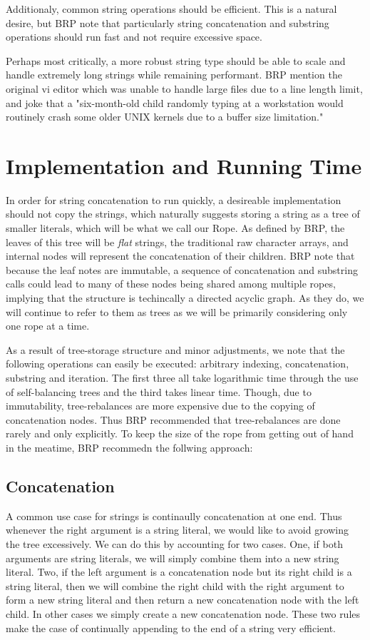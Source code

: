 \documentclass[12pt]{article}
\begin{document}
Additionaly, common string operations should be efficient. This is a natural desire, but BRP  note that particularly string concatenation and substring operations should run fast and not require excessive space.

Perhaps most critically, a more robust string type should be able to scale and handle extremely long strings while remaining performant. BRP mention the original vi editor which was unable to handle large files due to a line length limit, and joke that a "six-month-old child randomly typing at a workstation would routinely crash some older UNIX kernels due to a buffer size limitation."

\section{Implementation and Running Time}

In order for string concatenation to run quickly, a desireable implementation should not copy the strings, which naturally suggests storing a string as a tree of smaller literals, which will be what we call our Rope. As defined by BRP, the leaves of this tree will be \textit{flat} strings, the traditional raw character arrays, and internal nodes will represent the concatenation of their children. BRP note that because the leaf notes are immutable, a sequence of concatenation and substring calls could lead to many of these nodes being shared among multiple ropes, implying that the structure is techincally a directed acyclic graph. As they do, we will continue to refer to them as trees as we will be primarily considering only one rope at a time.

As a result of tree-storage structure and minor adjustments, we note that the following operations can easily be executed: arbitrary indexing, concatenation, substring and iteration.
The first three all take logarithmic time through the use of self-balancing trees and the third takes linear time. Though, due to immutability, tree-rebalances are more expensive due to the copying of concatenation nodes. Thus BRP recommended that tree-rebalances are done rarely and only explicitly. To keep the size of the rope from getting out of hand in the meatime, BRP recommedn the follwing approach:

\subsection{Concatenation}

A common use case for strings is continaully concatenation at one end. Thus whenever the right argument is a string literal, we would like to avoid growing the tree excessively. We can do this by accounting for two cases. One, if both arguments are string literals, we will simply combine them into a new string literal. Two, if the left argument is a concatenation node but its right child is a string literal, then we will combine the right child with the right argument to form a new string literal and then return a new concatenation node with the left child. In other cases we simply create a new concatenation node. These two rules make the case of continually appending to the end of a string very efficient.
\end{document}
